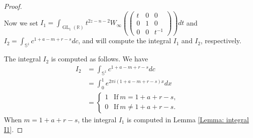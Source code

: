 \documentclass[11pt, a4paper]{amsart}
\theoremstyle{plain}
\theoremstyle{definition}
\numberwithin{equation}{section}
\def\RR{\mathbb{R}}
\DeclareMathOperator{\GL}{\mathrm{GL}}
\begin{document}
\begin{proof}
\begin{equation*}
    \end{equation*}
    Now we set $I_1 = \int_{\GL_1(\RR)} t^{2z - n - 2} W_{\infty}( \begin{pmatrix}
                                                                        t & 0 & 0 \\
                                                                        0 & 1 & 0 \\
                                                                        0 & 0 & t^{-1} 
                                                                      \end{pmatrix}) dt$ and $I_2 = \int_{\mathbb{S}^{1}} c^{1 + a - m + r - s} dc$, 
    and will compute the integral $I_1$ and $I_2$, respectively. 

    \par The integral $I_2$ is computed as follows. 
         We have 
         \begin{align*}
             I_2 & = \int_{\mathbb{S}^{1}} c^{1 + a - m + r - s} dc \\
                 & = \int_{0}^{1} e^{2\pi{i}(1 + a - m + r - s)x} dx \\
                 & = \begin{cases}
                        1 & \text{If}\ m = 1+ a + r - s, \\
                        0 & \text{If}\ m \neq 1+ a + r - s. 
                     \end{cases}
         \end{align*}
    When $m = 1 + a + r - s$, the integral $I_1$ is computed in Lemma \ref{Lemma: integral I1}. 
    

\end{proof}
\end{document}
